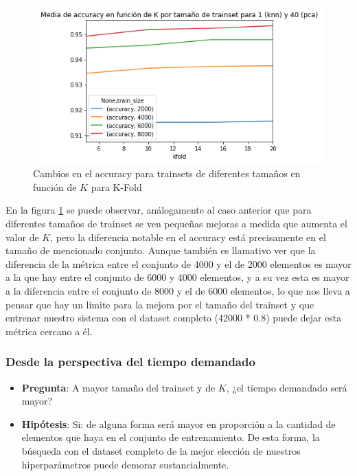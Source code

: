 \begin{figure}[H]
    \centering
    \includegraphics[scale=0.7]{images/KFoldAccTrainSize.png}
    \caption{Cambios en el accuracy para trainsets de diferentes tamaños en función de $K$ para K-Fold}
    \label{fig:KFoldAccTrainSize}
\end{figure}

En la figura \ref{fig:KFoldAccTrainSize} se puede observar, análogamente al caso anterior que para diferentes tamaños de trainset se ven pequeñas mejoras a medida que aumenta el valor de $K$, pero la diferencia notable en el accuracy está precisamente en el tamaño de mencionado conjunto. Aunque también es llamativo ver que la diferencia de la métrica entre el conjunto de 4000 y el de 2000 elementos es mayor a la que hay entre el conjunto de 6000 y 4000 elementos, y a su vez esta es mayor a la diferencia entre el conjunto de 8000 y el de 6000 elementos, lo que nos lleva a pensar que hay un límite para la mejora por el tamaño del trainset y que entrenar nuestro sistema con el dataset completo (42000 * 0.8) puede dejar esta métrica cercano a él.

\subsubsection*{Desde la perspectiva del tiempo demandado}\label{KFoldTrainSizeDuration}

\begin{itemize}
    \item \textbf{Pregunta}: A mayor tamaño del trainset y de $K$, ¿el tiempo demandado será mayor?
    \item \textbf{Hipótesis}: Si: de alguna forma será mayor en proporción a la cantidad de elementos que haya en el conjunto de entrenamiento. De esta forma, la búsqueda con el dataset completo de la mejor elección de nuestros hiperparámetros puede demorar sustancialmente.
\end{itemize}

